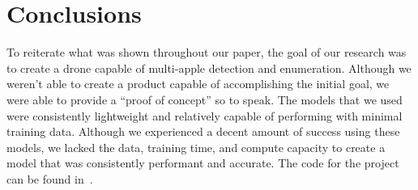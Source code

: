 \section{Conclusions}
To reiterate what was shown throughout our paper, the goal of our research was to create a drone capable of multi-apple detection and enumeration.
Although we weren't able to create a product capable of accomplishing the initial goal, we were able to provide a ``proof of concept'' so to speak.
The models that we used were consistently lightweight and relatively capable of performing with minimal training data. 
Although we experienced a decent amount of success using these models, we lacked the data, training time, and compute capacity to create a model that was consistently performant and accurate.
The code for the project can be found in~\cite{FruitFly}.
